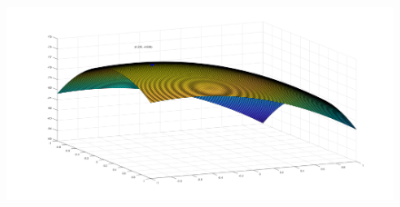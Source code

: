 \begin{enumerate}[label= (\alph*)]
    \begin{center}
        \begin{figure}[H]
            \centering
            \includegraphics[scale=0.3]{./matlab/chapter-4/sol4.41.d.surf.png}
        \end{figure}
    \end{center}
\end{enumerate}